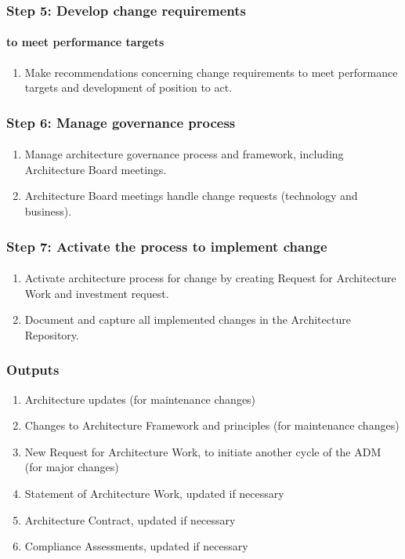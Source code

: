 \documentclass[aspectratio=169, table]{beamer}
\begin{document}
	\begin{frame}
		\frametitle{Step 5: Develop change requirements}
		\framesubtitle{to meet performance targets}
		\vspace{20pt}
		\begin{enumerate}
			\item Make recommendations concerning change requirements to meet
			performance targets and development of position to act.
		\end{enumerate}
	\end{frame}

	\begin{frame}
		\frametitle{Step 6: Manage governance process}
		\framesubtitle{\hspace{1cm}}
		\vspace{20pt}
		\begin{enumerate}
			\item Manage architecture governance process and framework, including Architecture Board meetings.

			\item Architecture Board meetings handle change requests (technology and business).
		\end{enumerate}

	\end{frame}

	\begin{frame}
		\frametitle{Step 7: Activate the process to implement change}
		\framesubtitle{\hspace{1cm}}
		\vspace{20pt}
		\begin{enumerate}
			\item Activate architecture process for change by creating Request for Architecture Work and investment request.

			\item Document and capture all implemented changes in the Architecture Repository.
		\end{enumerate}

	\end{frame}

	\begin{frame}
		\frametitle{Outputs}
		\vspace{22pt}
		\begin{enumerate}
			\item Architecture updates (for maintenance changes)
			\item Changes to Architecture Framework and principles (for maintenance changes)
			\item New Request for Architecture Work, to initiate another cycle of the ADM (for major changes)
			\item Statement of Architecture Work, updated if necessary
			\item Architecture Contract, updated if necessary
			\item Compliance Assessments, updated if necessary
		\end{enumerate}
	\end{frame}
\end{document}
